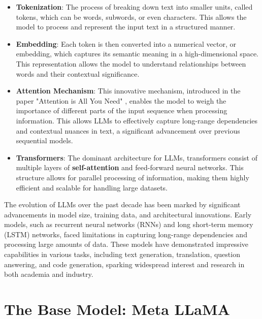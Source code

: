 \documentclass{article}
\begin{document}
		\begin{itemize}
			\item \textbf{Tokenization}: The process of breaking down text into smaller units, called tokens, which can be words, subwords, or even characters. This allows the model to process and represent the input text in a structured manner. 
			
			\item \textbf{Embedding}: Each token is then converted into a numerical vector, or embedding, which captures its semantic meaning in a high-dimensional space. This representation allows the model to understand relationships between words and their contextual significance.
			
			\item \textbf{Attention Mechanism}: This innovative mechanism, introduced in the paper "Attention is All You Need" \cite{vaswani2023attentionneed}, enables the model to weigh the importance of different parts of the input sequence when processing information. This allows LLMs to effectively capture long-range dependencies and contextual nuances in text, a significant advancement over previous sequential models.
			
			\item \textbf{Transformers}: The dominant architecture for LLMs, transformers consist of multiple layers of \textbf{self-attention} and feed-forward neural networks. This structure allows for parallel processing of information, making them highly efficient and scalable for handling large datasets.
		\end{itemize}	
		
		The evolution of LLMs over the past decade has been marked by significant advancements in model size, training data, and architectural innovations. 
		Early models, such as recurrent neural networks (RNNs) and long short-term memory (LSTM) networks, faced limitations in capturing long-range dependencies and processing large amounts of data. 
		These models have demonstrated impressive capabilities in various tasks, including text generation, translation, question answering, and code generation, sparking widespread interest and research in both academia and industry.
		
	\section{The Base Model: Meta LLaMA}
		
\end{document}
